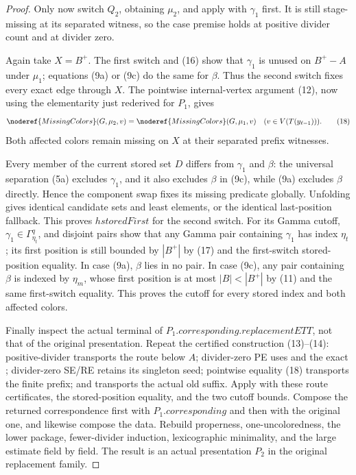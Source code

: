 \begin{proof}
Only now switch \(Q_2\), obtaining \(\mu_2\), and apply
 with \(\gamma_1\) first.  It is still
stage-missing at its separated witness, so the case premise holds at
positive divider count and at divider zero.

Again take \(X=B^+\).  The first switch and (16) show that
\(\gamma_1\) is unused on \(B^+-A\) under \(\mu_1\); equations (9a) or
(9c) do the same for \(\beta\).  Thus the second switch fixes every exact
edge through \(X\).  The pointwise internal-vertex argument (12), now
using the elementarity just rederived for \(P_1\), gives
\[
 \noderef{MissingColors}(G,\mu_2,v)=
 \noderef{MissingColors}(G,\mu_1,v)
             \quad(v\in V(T(y_{\ell-1}))).                  \tag{18}
\]
Both affected colors remain missing on \(X\) at their separated prefix
witnesses.

Every member of the current stored set \(D\) differs from
\(\gamma_1\) and \(\beta\): the universal separation (5a) excludes
\(\gamma_1\), and it also excludes \(\beta\) in (9c), while (9a)
excludes \(\beta\) directly.  Hence the component swap fixes its missing
predicate globally.  Unfolding
 gives identical candidate sets
and least elements, or the identical last-position fallback.  This proves
\(hstoredFirst\) for the second switch.  For its Gamma cutoff,
\(\gamma_1\in\Gamma^q_{\eta_t}\), and disjoint pairs show that any Gamma
pair containing \(\gamma_1\) has index \(\eta_t\); its first position is
still bounded by \(|B^+|\) by (17) and the first-switch stored-position
equality.  In case (9a), \(\beta\) lies in no pair.  In case (9c), any
pair containing \(\beta\) is indexed by \(\eta_m\), whose first position
is at most \(|B|<|B^+|\) by (11) and the same first-switch equality.
This proves the cutoff for every stored index and both affected colors.

Finally inspect the actual terminal
 of
\(P_1.\mathit{corresponding}.\mathit{replacementETT}\), not that of the
original presentation.  Repeat the certified construction
(13)--(14): positive-divider  transports
the route below \(A\); divider-zero PE uses
 and the exact
; divider-zero SE/RE retains its singleton
seed; pointwise equality (18) transports the finite prefix; and
 transports the
actual old suffix.  Apply
 with these route certificates,
the stored-position equality, and the two cutoff bounds.  Compose the
returned correspondence first with \(P_1.\mathit{corresponding}\) and
then with the original one, and likewise compose the
 data.  Rebuild properness,
one-uncoloredness, the lower package, fewer-divider induction,
lexicographic minimality, and the large estimate field by field.  The
result is an actual presentation \(P_2\) in the original replacement
family.


\end{proof}
